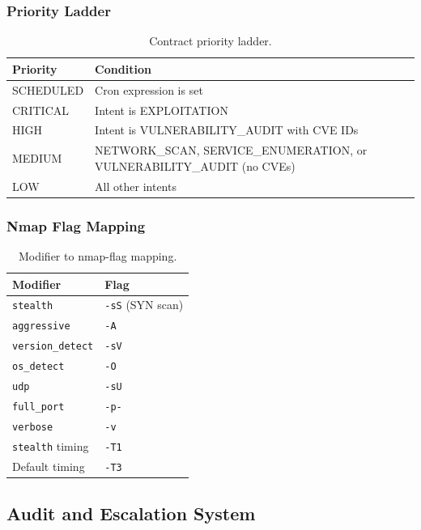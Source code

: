 \documentclass[10pt,journal,onecolumn]{IEEEtran}
\begin{document}
\subsubsection{Priority Ladder}
\begin{table}[h]
\caption{Contract priority ladder.}
\label{tab:priority}
\begin{tabularx}{\columnwidth}{l X}
\toprule
\textbf{Priority} & \textbf{Condition}\\
\midrule
SCHEDULED & Cron expression is set\\
CRITICAL & Intent is EXPLOITATION\\
HIGH & Intent is VULNERABILITY\_AUDIT with CVE IDs\\
MEDIUM & NETWORK\_SCAN, SERVICE\_ENUMERATION, or VULNERABILITY\_AUDIT (no CVEs)\\
LOW & All other intents\\
\bottomrule
\end{tabularx}
\end{table}

\subsubsection{Nmap Flag Mapping}
\begin{table}[h]
\caption{Modifier to nmap-flag mapping.}
\label{tab:nmapflags}
\begin{tabularx}{\columnwidth}{>{\ttfamily}l >{\ttfamily}l}
\toprule
\textbf{Modifier} & \textbf{Flag}\\
\midrule
\texttt{stealth} & \texttt{-sS} (SYN scan)\\
\texttt{aggressive} & \texttt{-A}\\
\texttt{version\_detect} & \texttt{-sV}\\
\texttt{os\_detect} & \texttt{-O}\\
\texttt{udp} & \texttt{-sU}\\
\texttt{full\_port} & \texttt{-p-}\\
\texttt{verbose} & \texttt{-v}\\
\texttt{stealth} timing & \texttt{-T1}\\
Default timing & \texttt{-T3}\\
\bottomrule
\end{tabularx}
\end{table}

\subsection{Audit and Escalation System}
\end{document}
